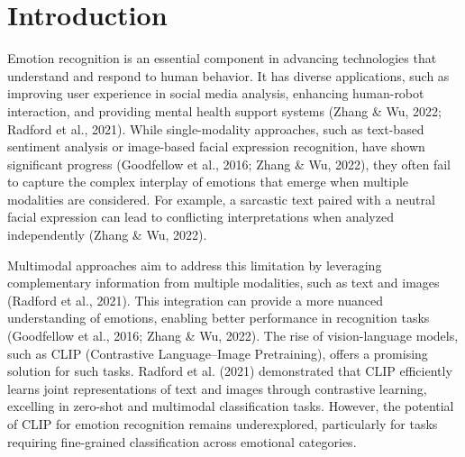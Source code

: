 \documentclass{article}
\theoremstyle{plain}
\theoremstyle{definition}
\theoremstyle{remark}
\begin{document}

\section{Introduction}
Emotion recognition is an essential component in advancing technologies that understand and respond to human behavior. It has diverse applications, such as improving user experience in social media analysis, enhancing human-robot interaction, and providing mental health support systems (Zhang \& Wu, 2022; Radford et al., 2021). While single-modality approaches, such as text-based sentiment analysis or image-based facial expression recognition, have shown significant progress (Goodfellow et al., 2016; Zhang \& Wu, 2022), they often fail to capture the complex interplay of emotions that emerge when multiple modalities are considered. For example, a sarcastic text paired with a neutral facial expression can lead to conflicting interpretations when analyzed independently (Zhang \& Wu, 2022).

Multimodal approaches aim to address this limitation by leveraging complementary information from multiple modalities, such as text and images (Radford et al., 2021). This integration can provide a more nuanced understanding of emotions, enabling better performance in recognition tasks (Goodfellow et al., 2016; Zhang \& Wu, 2022). The rise of vision-language models, such as CLIP (Contrastive Language–Image Pretraining), offers a promising solution for such tasks. Radford et al. (2021) demonstrated that CLIP efficiently learns joint representations of text and images through contrastive learning, excelling in zero-shot and multimodal classification tasks. However, the potential of CLIP for emotion recognition remains underexplored, particularly for tasks requiring fine-grained classification across emotional categories.
\end{document}
